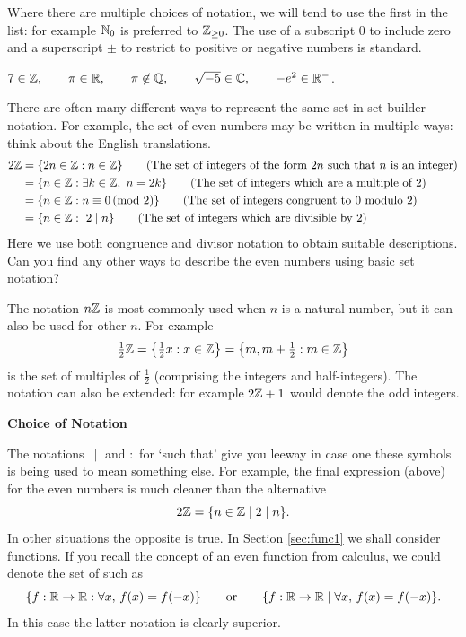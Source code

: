  Where there are multiple choices of notation, we will tend to use the first in the list: for example $\mathbb{N}_0$ is preferred to $\mathbb{Z}_{\ge 0}$. The use of a subscript $0$ to include zero and a superscript $\pm$ to restrict to positive or negative numbers is standard.

\begin{examples}{}{}
$7\in\mathbb{Z},\qquad \pi\in\mathbb{R},\qquad \pi\not\in\mathbb{Q},\qquad \sqrt{-5}\in\mathbb{C},\qquad -e^2\in\mathbb{R}^-$.\par

There are often many different ways to represent the same set in set-builder notation. For example, the set of even numbers may be written in multiple ways: think about the English translations.
\begin{align*}
2\mathbb{Z}&=\{2n\in\mathbb{Z}:n\in\mathbb{Z}\}\tag{The set of integers of the form $2n$ such that $n$ is an integer}\\
&=\{n\in\mathbb{Z}:\exists k\in\mathbb{Z},\ n=2k\} \tag{The set of integers which are a multiple of 2}\\
&=\{n\in\mathbb{Z}:n\equiv 0\negthickspace\pmod{2}\}\tag{The set of integers congruent to 0 modulo 2}\\
&=\{n\in\mathbb{Z}:\ 2\mid n\}\tag{The set of integers which are divisible by 2}
\end{align*}
Here we use both congruence and divisor notation to obtain suitable descriptions. Can you find any other ways to describe the even numbers using basic set notation?
\end{examples}

The notation $n\mathbb{Z}$ is most commonly used when $n$ is a natural number, but it can also be used for other $n$. For example
\[\tfrac 12\mathbb{Z}=\left\{\tfrac 12x:x\in\mathbb{Z}\right\}=\left\{m,m+\tfrac 12:m\in\mathbb{Z}\right\}\]
is the set of multiples of $\frac 12$ (comprising the integers and half-integers). The notation can also be extended: for example $2\mathbb{Z}+1$ would denote the odd integers.

\begin{aside}{}{}
{\bf Choice of Notation}

The notations $\,\mid$ and $:$ for `such that' give you leeway in case one these symbols is being used to mean something else. For example, the final expression (above) for the even numbers is much cleaner than the alternative
\[2\mathbb{Z}=\{n\in\mathbb{Z}\mid 2\mid n\}.\]
In other situations the opposite is true. In Section \ref{sec:func1} we shall consider functions. If you recall the concept of an even function from calculus, we could denote the set of such as
\[\{f:\mathbb{R}\to\mathbb{R}:\forall x,\,f(x)=f(-x)\}\qquad\text{or}\qquad\{f:\mathbb{R}\to\mathbb{R}\mid \forall x,\,f(x)=f(-x)\}.\]
In this case the latter notation is clearly superior.
\end{aside}

